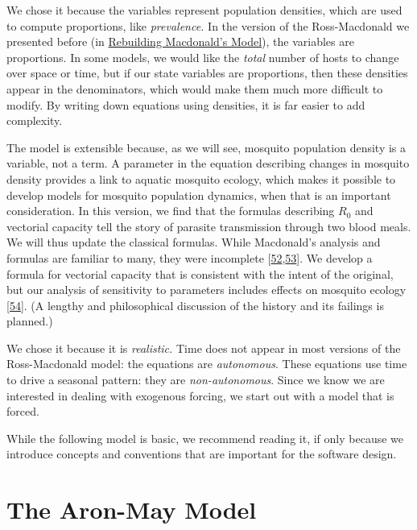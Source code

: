 \documentclass[
]{book}
\begin{document}
We chose it because the variables represent population densities, which are used to compute proportions, like \emph{prevalence.} In the version of the Ross-Macdonald we presented before (in \protect\hyperlink{rebuilding-macdonalds-model}{Rebuilding Macdonald's Model}), the variables are proportions. In some models, we would like the \emph{total} number of hosts to change over space or time, but if our state variables are proportions, then these densities appear in the denominators, which would make them much more difficult to modify. By writing down equations using densities, it is far easier to add complexity.

The model is extensible because, as we will see, mosquito population density is a variable, not a term. A parameter in the equation describing changes in mosquito density provides a link to aquatic mosquito ecology, which makes it possible to develop models for mosquito population dynamics, when that is an important consideration. In this version, we find that the formulas describing \(R_0\) and vectorial capacity tell the story of parasite transmission through two blood meals. We will thus update the classical formulas. While Macdonald's analysis and formulas are familiar to many, they were incomplete {[}\protect\hyperlink{ref-SmithDL2004_Statics}{52},\protect\hyperlink{ref-SmithDL2021_NewTestOldMosquitoes}{53}{]}. We develop a formula for vectorial capacity that is consistent with the intent of the original, but our analysis of sensitivity to parameters includes effects on mosquito ecology {[}\protect\hyperlink{ref-BradyOJ2015AdultVector}{54}{]}. (A lengthy and philosophical discussion of the history and its failings is planned.)

We chose it because it is \emph{realistic.} Time does not appear in most versions of the Ross-Macdonald model: the equations are \emph{autonomous}. These equations use time to drive a seasonal pattern: they are \emph{non-autonomous}. Since we know we are interested in dealing with exogenous forcing, we start out with a model that is forced.

While the following model is basic, we recommend reading it, if only because we introduce concepts and conventions that are important for the software design.

\hypertarget{the-aron-may-model}{%
\section{The Aron-May Model}\label{the-aron-may-model}}
\end{document}
